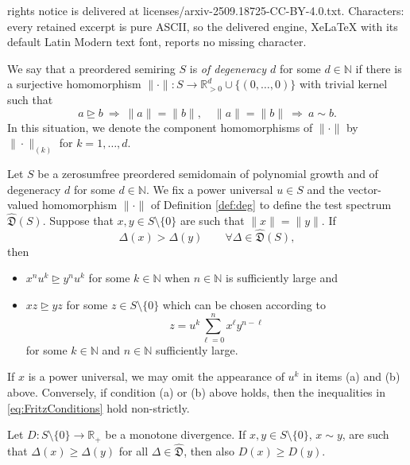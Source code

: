 \documentclass[10pt,a4paper]{amsart}
\newcommand{\N}{\mathbb N}
\newcommand{\R}{\mathbb R}
\newcommand{\mf}[1]{\mathfrak{#1}}
\newcommand{\rgeq}{\trianglerighteq}
\begin{document}
rights notice is delivered at licenses/arxiv-2509.18725-CC-BY-4.0.txt. Characters: every retained excerpt is pure ASCII, so the delivered engine, XeLaTeX with its default Latin Modern text font, reports no missing character.
\begin{definition}\label{def:deg}
We say that a preordered semiring $S$ is {\it of degeneracy $d$} for some $d\in\N$ if there is a surjective homomorphism $\|\cdot\|:S\to\R_{>0}^d\cup\{(0,\ldots,0)\}$ with trivial kernel such that
$$
a\rgeq b\ \Rightarrow\ \|a\|=\|b\|,\quad \|a\|=\|b\|\ \Rightarrow\ a\sim b.
$$
In this situation, we denote the component homomorphisms of $\|\cdot\|$ by $\|\cdot\|_{(k)}$ for $k=1,\ldots,d$.
\end{definition}

\begin{theorem}\label{thm:Vergleichsstellensatz}
Let $S$ be a zerosumfree preordered semidomain of polynomial growth and of degeneracy $d$ for some $d\in\N$. We fix a power universal $u\in S$ and the vector-valued homomorphism $\|\cdot\|$ of Definition \ref{def:deg} to define the test spectrum $\hat{\mf D}(S)$. Suppose that $x,y\in S\setminus\{0\}$ are such that $\|x\|=\|y\|$. If
\begin{equation}\label{eq:FritzConditions}
\Delta(x)>\Delta(y)\qquad\forall\Delta\in\hat{\mf D}(S),
\end{equation}
then
\begin{itemize}
\item[(a)] $x^nu^k\rgeq y^nu^k$ for some $k\in\N$ when $n\in\N$ is sufficiently large and
\item[(b)] $xz\rgeq yz$ for some $z\in S\setminus\{0\}$ which can be chosen according to
$$
z=u^k\sum_{\ell=0}^n x^\ell y^{n-\ell}
$$
for some $k\in\N$ and $n\in\N$ sufficiently large.
\end{itemize}
If $x$ is a power universal, we may omit the appearance of $u^k$ in items (a) and (b) above. Conversely, if condition (a) or (b) above holds, then the inequalities in \eqref{eq:FritzConditions} hold non-strictly.
\end{theorem}

\begin{lemma}\label{lemma:key}
Let $D:S\setminus\{0\}\to\R_+$ be a monotone divergence. If $x,y\in S\setminus\{0\}$, $x\sim y$, are such that $\Delta(x)\geq\Delta(y)$ for all $\Delta\in\hat{\mf D}$, then also $D(x)\geq D(y)$.
\end{lemma}
\end{document}
